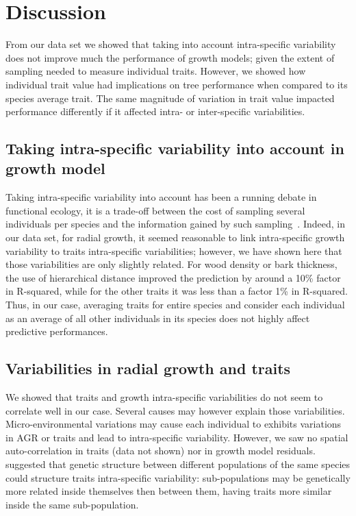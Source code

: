 \label{sec:Disc}
\section*{Discussion}

From our data set we showed that taking into account intra-specific variability does not improve much the performance of growth models; given the extent of sampling needed to measure individual traits. However, we showed how individual trait value had implications on tree performance when compared to its species average trait. The same magnitude of variation in trait value impacted performance differently if it affected intra- or inter-specific variabilities.

\subsection*{Taking intra-specific variability into account in growth model}

Taking intra-specific variability into account has been a running debate in functional ecology, it is a trade-off between the cost of sampling several individuals per species and the information gained by such sampling~\citep{albert_when_2011, violle_return_2012}. Indeed, in our data set, for radial growth, it seemed reasonable to link intra-specific growth variability to traits intra-specific variabilities; however, we have shown here that those variabilities are only slightly related. For wood density or bark thickness, the use of hierarchical distance improved the prediction by around a 10\% factor in R-squared, while for the other traits it was less than a factor 1\% in R-squared. Thus, in our case, averaging traits for entire species and consider each individual as an average of all other individuals in its species does not highly affect predictive performances.

\subsection*{Variabilities in radial growth and traits}

We showed that traits and growth intra-specific variabilities do not seem to correlate well in our case. Several causes may however explain those variabilities. Micro-environmental variations may cause each individual to exhibits variations in AGR or traits and lead to intra-specific variability. However, we saw no spatial auto-correlation in traits (data not shown) nor in growth model residuals.~\citet{albert_intraspecific_2010} suggested that genetic structure between different populations of the same species could structure traits intra-specific variability: sub-populations may be genetically more related inside themselves then between them, having traits more similar inside the same sub-population.

